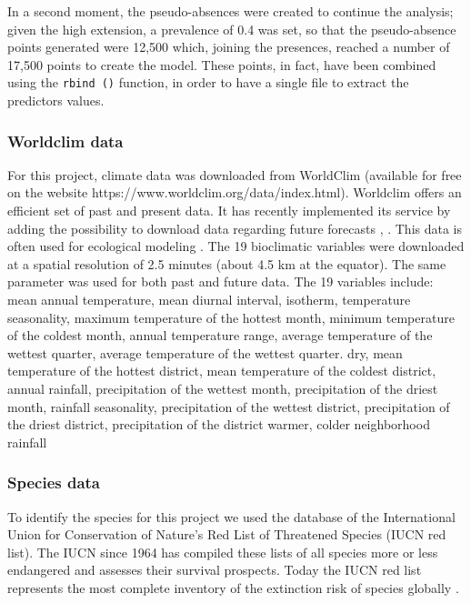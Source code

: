 \documentclass[12pt,a4paper]{article}
\begin{document}
In a second moment, the pseudo-absences were created to continue the analysis; given the high extension, a prevalence of 0.4 was set, so that the pseudo-absence points generated were 12,500 which, joining the presences, reached a number of 17,500 points to create the model.
These points, in fact, have been combined using the \texttt {rbind ()} function, in order to have a single file to extract the predictors values.
\subsubsection{Worldclim data}
For this project, climate data was downloaded from WorldClim (available for free on the website https://www.worldclim.org/data/index.html).
Worldclim offers an efficient set of past and present data. It has recently implemented its service by adding the possibility to download data regarding future forecasts \citep{wc}, \citep{ey}. This data is often used for ecological modeling \citep{bcw}. 
The 19 bioclimatic variables were downloaded at a spatial resolution of 2.5 minutes (about 4.5 km at the equator). The same parameter was used for both past and future data.
The 19 variables include: mean annual temperature, mean diurnal interval, isotherm, temperature seasonality, maximum temperature of the hottest month, minimum temperature of the coldest month, annual temperature range, average temperature of the wettest quarter, average temperature of the wettest quarter. dry, mean temperature of the hottest district, mean temperature of the coldest district, annual rainfall, precipitation of the wettest month, precipitation of the driest month, rainfall seasonality, precipitation of the wettest district, precipitation of the driest district, precipitation of the district warmer, colder neighborhood rainfall 
\subsubsection{Species data}
To identify the species for this project we used the database of the International Union for Conservation of Nature's Red List of Threatened Species (IUCN red list).
The IUCN since 1964 has compiled these lists of all species more or less endangered and assesses their survival prospects. Today the IUCN red list represents the most complete inventory of the extinction risk of species globally \citep {IUCN}.
\end{document}
